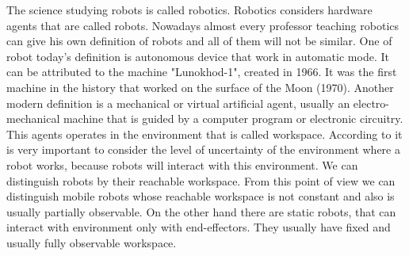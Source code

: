 \documentclass[12pt,a4paper]{report}
\begin{document}
		The science studying robots is called robotics. Robotics considers hardware agents that are called robots. 		Nowadays almost every professor teaching robotics can give his own definition of robots and all of them will not be similar. One of robot today's definition is autonomous device that work in automatic mode. It can be attributed to the machine "Lunokhod-1", created in 1966. It was the first machine in the history that worked on the surface of the Moon (1970). Another modern definition is a mechanical or virtual artificial agent, usually an electro-mechanical machine that is guided by a computer program or electronic circuitry. This agents operates in the environment that is called workspace. According to \cite{pfeifer2007self} it is very important to consider the level of uncertainty of the environment where a robot works, because robots will interact with this environment. We can distinguish robots by their reachable workspace. From this point of view we can distinguish mobile robots whose reachable workspace is not constant and also is usually partially observable. On the other hand there are static robots, that can interact with environment only with end-effectors. They usually have fixed and usually fully observable workspace. 
		
\end{document}
